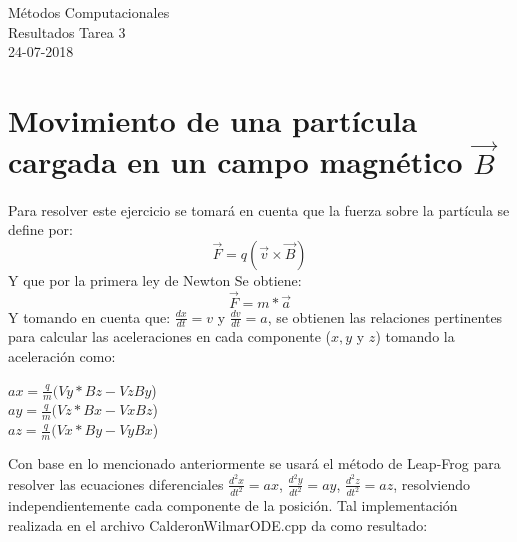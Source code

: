 \documentclass[11pt,letterpaper]{exam}
\begin{document}
\begin{center}
{\Large Métodos Computacionales} \\
Resultados Tarea 3\\
24-07-2018\\
\end{center}

\begin{abstract}
El caso de estudio en este trabajo es la soluci\'on de Ecuaciones Diferenciales, para observar como es el comportamiento de dos diferentes sistemas. En el primer sistema, se estudia una particula cargada ($q=1.5,m=2.5$) que se encuentra bajo la influencia de un campo magn\'etico uniforme $\vec{B}=(0.0,0.0,3.0)$ y se busca encontrar la posici\'on futura de la part\'icula con base en las condiciones iniciales dadas, Con el fin de resolver este problema se har\'a uso de ecuaciones diferenciales ordinarias. Por otro lado, el segundo sistema consta del estudio de una membrana de un tambor, la cual se buscar\'a analizar tomando los extremos (Frontera) del tambor fijos y libre para observar las diferencias entre el comportamiento de la membrana para cada caso particular.
\end{abstract}


\section{Movimiento de una part\'icula cargada en un campo magn\'etico $\vec{B}$}

Para resolver este ejercicio se tomar\'a en cuenta que la fuerza sobre la part\'icula se define por:
\begin{equation}
\vec{F}= q(\vec{v} \times{\vec{B}})
\end{equation} 
Y que por la primera ley de Newton Se obtiene:
\begin{equation}
\vec{F}= m*\vec{a}
\end{equation}
Y tomando en cuenta que: $\frac{dx}{dt}=v$ y $\frac{dv}{dt}=a$, se obtienen las relaciones pertinentes para calcular las aceleraciones en cada componente ($x,y$ y $z$) tomando la aceleraci\'on como: \\
\begin{center}
$ax=\frac{q}{m}(Vy*Bz-VzBy$) \\
$ay=\frac{q}{m}(Vz*Bx-VxBz$) \\
$az=\frac{q}{m}(Vx*By-VyBx$) \\
\end{center}
Con base en lo mencionado anteriormente se usar\'a el m\'etodo de Leap-Frog para resolver las ecuaciones diferenciales $\frac{{d}^2x}{{dt}^2}=ax$, $\frac{{d}^2y}{{dt}^2}=ay$, $\frac{{d}^2z}{{dt}^2}=az$, resolviendo independientemente cada componente de la posici\'on.
Tal implementaci\'on realizada en el archivo CalderonWilmarODE.cpp da como resultado:
\end{document}
